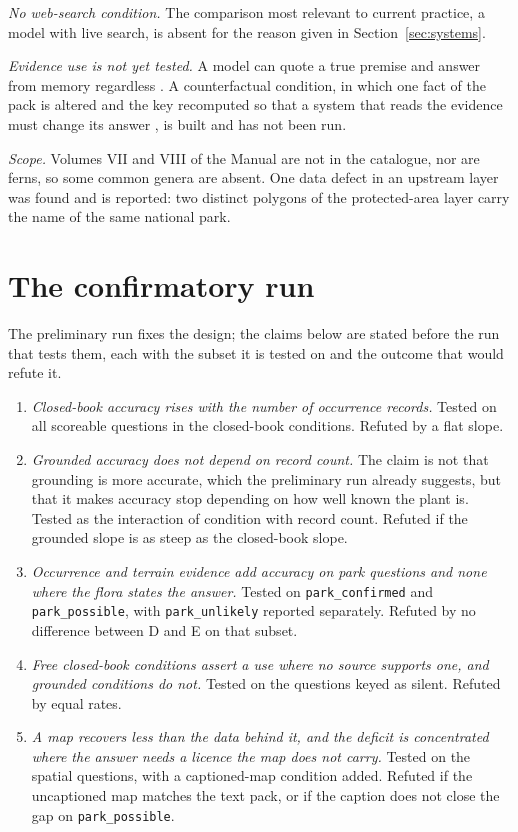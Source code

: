 \documentclass[11pt,a4paper]{article}
\newcommand{\vt}[1]{\texttt{#1}}          %
\begin{document}
\emph{No web-search condition.} The comparison most relevant to current practice, a
model with live search, is absent for the reason given in Section~\ref{sec:systems}.

\emph{Evidence use is not yet tested.} A model can quote a true premise and answer
from memory regardless \citep{mccoy2019right}. A counterfactual condition, in which
one fact of the pack is altered and the key recomputed so that a system that reads
the evidence must change its answer \citep{longpre2021conflicts}, is built and has
not been run.

\emph{Scope.} Volumes VII and VIII of the Manual are not in the catalogue, nor are
ferns, so some common genera are absent. One data defect in an upstream layer was
found and is reported: two distinct polygons of the protected-area layer carry the
name of the same national park.

\section{The confirmatory run}\label{sec:confirmatory}

The preliminary run fixes the design; the claims below are stated before the run that
tests them, each with the subset it is tested on and the outcome that would refute
it.

\begin{enumerate}
  \item \emph{Closed-book accuracy rises with the number of occurrence records.}
        Tested on all scoreable questions in the closed-book conditions. Refuted by a
        flat slope.
  \item \emph{Grounded accuracy does not depend on record count.} The claim is not
        that grounding is more accurate, which the preliminary run already suggests,
        but that it makes accuracy stop depending on how well known the plant is.
        Tested as the interaction of condition with record count. Refuted if the
        grounded slope is as steep as the closed-book slope.
  \item \emph{Occurrence and terrain evidence add accuracy on park questions and
        none where the flora states the answer.} Tested on \vt{park\_confirmed} and
        \vt{park\_possible}, with \vt{park\_unlikely} reported separately. Refuted by
        no difference between D and E on that subset.
  \item \emph{Free closed-book conditions assert a use where no source supports
        one, and grounded conditions do not.} Tested on the questions keyed as
        silent. Refuted by equal rates.
  \item \emph{A map recovers less than the data behind it, and the deficit is
        concentrated where the answer needs a licence the map does not carry.} Tested
        on the spatial questions, with a captioned-map condition added. Refuted if
        the uncaptioned map matches the text pack, or if the caption does not close
        the gap on \vt{park\_possible}.
\end{enumerate}
\end{document}
